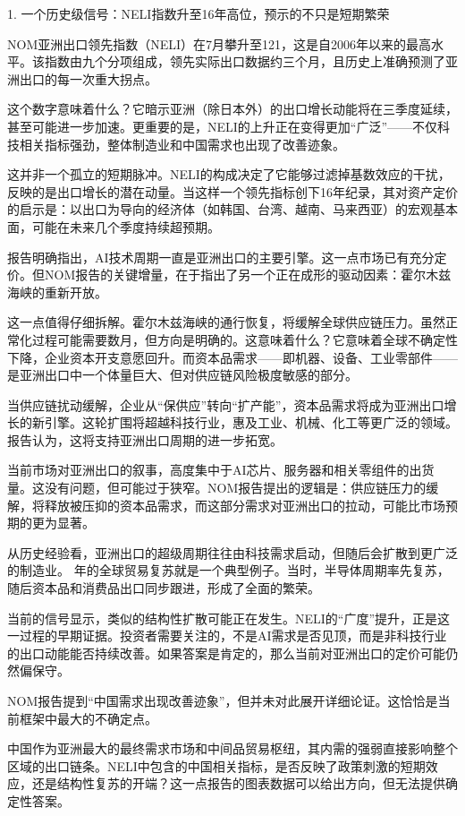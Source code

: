 \documentclass[11pt]{ctexart}
\begin{document}
1. 一个历史级信号：NELI指数升至16年高位，预示的不只是短期繁荣

NOM亚洲出口领先指数（NELI）在7月攀升至121，这是自2006年以来的最高水平。该指数由九个分项组成，领先实际出口数据约三个月，且历史上准确预测了亚洲出口的每一次重大拐点。

这个数字意味着什么？它暗示亚洲（除日本外）的出口增长动能将在三季度延续，甚至可能进一步加速。更重要的是，NELI的上升正在变得更加“广泛”——不仅科技相关指标强劲，整体制造业和中国需求也出现了改善迹象。

这并非一个孤立的短期脉冲。NELI的构成决定了它能够过滤掉基数效应的干扰，反映的是出口增长的潜在动量。当这样一个领先指标创下16年纪录，其对资产定价的启示是：以出口为导向的经济体（如韩国、台湾、越南、马来西亚）的宏观基本面，可能在未来几个季度持续超预期。

报告明确指出，AI技术周期一直是亚洲出口的主要引擎。这一点市场已有充分定价。但NOM报告的关键增量，在于指出了另一个正在成形的驱动因素：霍尔木兹海峡的重新开放。

这一点值得仔细拆解。霍尔木兹海峡的通行恢复，将缓解全球供应链压力。虽然正常化过程可能需要数月，但方向是明确的。这意味着什么？它意味着全球不确定性下降，企业资本开支意愿回升。而资本品需求——即机器、设备、工业零部件——是亚洲出口中一个体量巨大、但对供应链风险极度敏感的部分。

当供应链扰动缓解，企业从“保供应”转向“扩产能”，资本品需求将成为亚洲出口增长的新引擎。这轮扩围将超越科技行业，惠及工业、机械、化工等更广泛的领域。报告认为，这将支持亚洲出口周期的进一步拓宽。

当前市场对亚洲出口的叙事，高度集中于AI芯片、服务器和相关零组件的出货量。这没有问题，但可能过于狭窄。NOM报告提出的逻辑是：供应链压力的缓解，将释放被压抑的资本品需求，而这部分需求对亚洲出口的拉动，可能比市场预期的更为显著。

从历史经验看，亚洲出口的超级周期往往由科技需求启动，但随后会扩散到更广泛的制造业。 年的全球贸易复苏就是一个典型例子。当时，半导体周期率先复苏，随后资本品和消费品出口同步跟进，形成了全面的繁荣。

当前的信号显示，类似的结构性扩散可能正在发生。NELI的“广度”提升，正是这一过程的早期证据。投资者需要关注的，不是AI需求是否见顶，而是非科技行业的出口动能能否持续改善。如果答案是肯定的，那么当前对亚洲出口的定价可能仍然偏保守。

NOM报告提到“中国需求出现改善迹象”，但并未对此展开详细论证。这恰恰是当前框架中最大的不确定点。

中国作为亚洲最大的最终需求市场和中间品贸易枢纽，其内需的强弱直接影响整个区域的出口链条。NELI中包含的中国相关指标，是否反映了政策刺激的短期效应，还是结构性复苏的开端？这一点报告的图表数据可以给出方向，但无法提供确定性答案。
\end{document}
